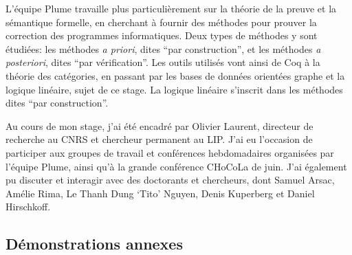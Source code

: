 \documentclass[11pt,a4paper]{article}
\theoremstyle{plain}
\theoremstyle{definition}
\theoremstyle{remark}
\begin{document}
L'équipe Plume travaille plus particulièrement sur la théorie de la preuve et la sémantique formelle, en cherchant à fournir des méthodes pour prouver la correction des programmes informatiques. Deux types de méthodes y sont étudiées: les méthodes \textit{a priori}, dites ``par construction'', et les méthodes \textit{a posteriori}, dites ``par vérification''. Les outils utilisés vont ainsi de Coq à la théorie des catégories, en passant par les bases de données orientées graphe et la logique linéaire, sujet de ce stage. La logique linéaire s'inscrit dans les méthodes dites ``par construction''.

Au cours de mon stage, j'ai été encadré par Olivier Laurent, directeur de recherche au CNRS et chercheur permanent au LIP. J'ai eu l'occasion de participer aux groupes de travail et conférences hebdomadaires organisées par l'équipe Plume, ainsi qu'à la grande conférence CHoCoLa de juin. J'ai également pu discuter et interagir avec des doctorants et chercheurs, dont Samuel Arsac, Amélie Rima, Le Thanh Dung ‘Tito’ Nguyen, Denis Kuperberg et Daniel Hirschkoff.

\subsection{Démonstrations annexes}
\end{document}
